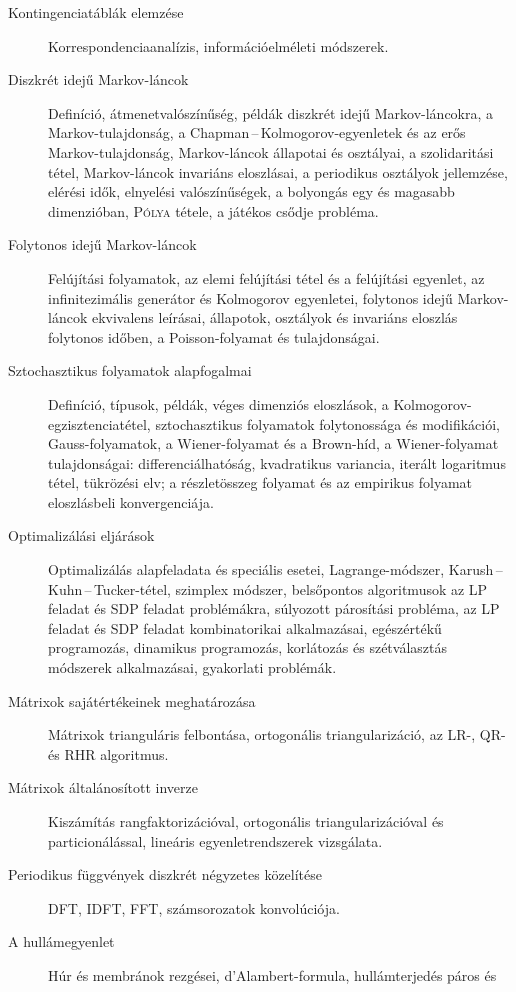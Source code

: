 \documentclass[DIV=15,appendixprefix]{scrreprt}
\theoremstyle{definition}
\theoremstyle{remark}
\begin{document}
\begin{description}
%
	\item[Kontingenciatáblák elemzése] Korrespondenciaanalízis, információelméleti módszerek.
%
	\item[Diszkrét idejű Markov-láncok] Definíció, átmenetvalószínűség, példák diszkrét idejű
	Markov-lán\-cok\-ra, a Markov-tulajdonság, a Chapman\,--\,Kolmogorov-egyenletek és az erős
	Markov-tu\-laj\-don\-ság, Markov-láncok állapotai és osztályai, a szolidaritási tétel, Markov-láncok
	invariáns eloszlásai, a periodikus osztályok jellemzése, elérési idők, elnyelési valószínűségek,
	a bolyongás egy és magasabb dimenzióban, \textsc{Pólya} tétele, a játékos csődje probléma.
%
	\item[Folytonos idejű Markov-láncok] Felújítási folyamatok, az elemi felújítási tétel és a
	felújítási egyenlet, az infinitezimális generátor és Kolmogorov egyenletei, folytonos idejű
	Markov-láncok ekvivalens leírásai, állapotok, osztályok és invariáns eloszlás folytonos időben,
	a Poisson-folyamat és tulajdonságai.
%
	\item[Sztochasztikus folyamatok alapfogalmai] Definíció, típusok, példák, véges dimenziós
	eloszlások, a Kolmogorov-egzisztenciatétel, sztochasztikus folyamatok folytonossága és
	modifikációi, Gauss-folyamatok, a Wiener-folyamat és a Brown-híd, a Wiener-folyamat
	tulajdonságai: differenciálhatóság, kvadratikus variancia, iterált logaritmus tétel, tükrözési
	elv; a részletösszeg folyamat és az empirikus folyamat eloszlásbeli konvergenciája.
%
	\item[Optimalizálási eljárások] Optimalizálás alapfeladata és speciális esetei,
	Lagrange-módszer, Karush\,--\,Kuhn\,--\,Tucker-tétel, szimplex módszer, belsőpontos algoritmusok
	az LP feladat és SDP feladat problémákra, súlyozott párosítási probléma, az LP feladat és SDP
	feladat kombinatorikai alkalmazásai, egészértékű programozás, dinamikus programozás, korlátozás
	és szétválasztás módszerek alkalmazásai, gyakorlati problémák.
%
	\item[Mátrixok sajátértékeinek meghatározása] Mátrixok trianguláris felbontása, ortogonális
	triangularizáció, az LR-, QR- és RHR algoritmus.
%
	\item[Mátrixok általánosított inverze] Kiszámítás rangfaktorizációval, ortogonális
	triangularizációval és particionálással, lineáris egyenletrendszerek vizsgálata.
%
	\item[Periodikus függvények diszkrét négyzetes közelítése] DFT, IDFT, FFT, számsorozatok
	konvolúciója.
%
	\item[A hullámegyenlet] Húr és membránok rezgései, d'Alambert-formula, hullámterjedés páros és

\end{description}
\end{document}
